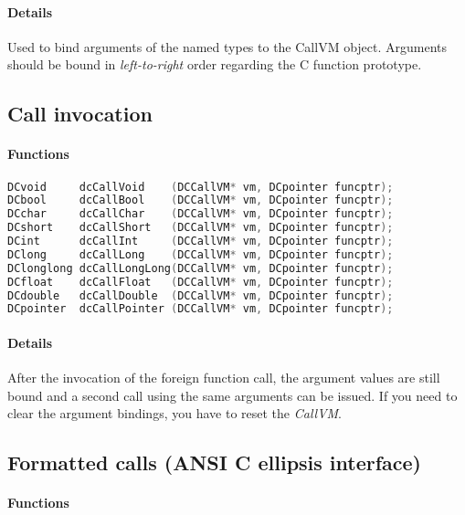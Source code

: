 \paragraph{Details}

Used to bind arguments of the named types to the CallVM object.
Arguments should be bound in \emph{left-to-right} order regarding the C
function prototype.\\

\subsection{Call invocation}

\paragraph{Functions}

\begin{lstlisting}[language=c]
DCvoid     dcCallVoid    (DCCallVM* vm, DCpointer funcptr);
DCbool     dcCallBool    (DCCallVM* vm, DCpointer funcptr);
DCchar     dcCallChar    (DCCallVM* vm, DCpointer funcptr);
DCshort    dcCallShort   (DCCallVM* vm, DCpointer funcptr);
DCint      dcCallInt     (DCCallVM* vm, DCpointer funcptr);
DClong     dcCallLong    (DCCallVM* vm, DCpointer funcptr);
DClonglong dcCallLongLong(DCCallVM* vm, DCpointer funcptr);
DCfloat    dcCallFloat   (DCCallVM* vm, DCpointer funcptr);
DCdouble   dcCallDouble  (DCCallVM* vm, DCpointer funcptr);
DCpointer  dcCallPointer (DCCallVM* vm, DCpointer funcptr);
\end{lstlisting}

\paragraph{Details}

After the invocation of the foreign function call, the argument values are
still bound and a second call using the same arguments can be issued. If you
need to clear the argument bindings, you have to reset the \emph{CallVM}.

\pagebreak

\subsection{Formatted calls (ANSI C ellipsis interface)}

\paragraph{Functions}

